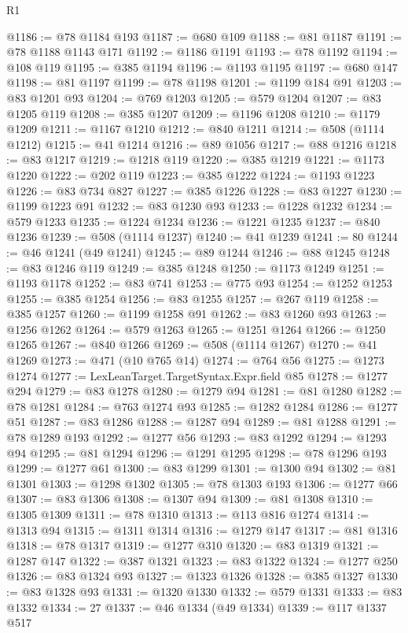 \begin{lexlean}{R1}
\begin{coremodule}
@1186 := @78 @1184 @193
@1187 := @680 @109
@1188 := @81 @1187
@1191 := @78 @1188 @1143 @171
@1192 := @1186 @1191
@1193 := @78 @1192
@1194 := @108 @119
@1195 := @385 @1194
@1196 := @1193 @1195
@1197 := @680 @147
@1198 := @81 @1197
@1199 := @78 @1198
@1201 := @1199 @184 @91
@1203 := @83 @1201 @93
@1204 := @769 @1203
@1205 := @579 @1204
@1207 := @83 @1205 @119
@1208 := @385 @1207
@1209 := @1196 @1208
@1210 := @1179 @1209
@1211 := @1167 @1210
@1212 := @840 @1211
@1214 := @508 (@1114 @1212)
@1215 := @41 @1214
@1216 := @89 @1056
@1217 := @88 @1216
@1218 := @83 @1217
@1219 := @1218 @119
@1220 := @385 @1219
@1221 := @1173 @1220
@1222 := @202 @119
@1223 := @385 @1222
@1224 := @1193 @1223
@1226 := @83 @734 @827
@1227 := @385 @1226
@1228 := @83 @1227
@1230 := @1199 @1223 @91
@1232 := @83 @1230 @93
@1233 := @1228 @1232
@1234 := @579 @1233
@1235 := @1224 @1234
@1236 := @1221 @1235
@1237 := @840 @1236
@1239 := @508 (@1114 @1237)
@1240 := @41 @1239
@1241 := 80
@1244 := @46 @1241 (@49 @1241)
@1245 := @89 @1244
@1246 := @88 @1245
@1248 := @83 @1246 @119
@1249 := @385 @1248
@1250 := @1173 @1249
@1251 := @1193 @1178
@1252 := @83 @741
@1253 := @775 @93
@1254 := @1252 @1253
@1255 := @385 @1254
@1256 := @83 @1255
@1257 := @267 @119
@1258 := @385 @1257
@1260 := @1199 @1258 @91
@1262 := @83 @1260 @93
@1263 := @1256 @1262
@1264 := @579 @1263
@1265 := @1251 @1264
@1266 := @1250 @1265
@1267 := @840 @1266
@1269 := @508 (@1114 @1267)
@1270 := @41 @1269
@1273 := @471 (@10 @765 @14)
@1274 := @764 @56
@1275 := @1273 @1274
@1277 := LexLeanTarget.TargetSyntax.Expr.field @85
@1278 := @1277 @294
@1279 := @83 @1278
@1280 := @1279 @94
@1281 := @81 @1280
@1282 := @78 @1281
@1284 := @763 @1274 @93
@1285 := @1282 @1284
@1286 := @1277 @51
@1287 := @83 @1286
@1288 := @1287 @94
@1289 := @81 @1288
@1291 := @78 @1289 @193
@1292 := @1277 @56
@1293 := @83 @1292
@1294 := @1293 @94
@1295 := @81 @1294
@1296 := @1291 @1295
@1298 := @78 @1296 @193
@1299 := @1277 @61
@1300 := @83 @1299
@1301 := @1300 @94
@1302 := @81 @1301
@1303 := @1298 @1302
@1305 := @78 @1303 @193
@1306 := @1277 @66
@1307 := @83 @1306
@1308 := @1307 @94
@1309 := @81 @1308
@1310 := @1305 @1309
@1311 := @78 @1310
@1313 := @113 @816 @1274
@1314 := @1313 @94
@1315 := @1311 @1314
@1316 := @1279 @147
@1317 := @81 @1316
@1318 := @78 @1317
@1319 := @1277 @310
@1320 := @83 @1319
@1321 := @1287 @147
@1322 := @387 @1321
@1323 := @83 @1322
@1324 := @1277 @250
@1326 := @83 @1324 @93
@1327 := @1323 @1326
@1328 := @385 @1327
@1330 := @83 @1328 @93
@1331 := @1320 @1330
@1332 := @579 @1331
@1333 := @83 @1332
@1334 := 27
@1337 := @46 @1334 (@49 @1334)
@1339 := @117 @1337 @517

\end{coremodule}
\end{lexlean}
